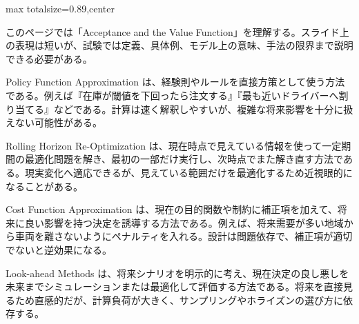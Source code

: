 \begin{minipage}[t]{0.58\textwidth}
\begin{adjustbox}{max totalsize={\textwidth}{0.89\textheight},center}
\begin{minipage}{\textwidth}\scriptsize
{}このページでは「Acceptance and the Value Function」を理解する。スライド上の表現は短いが、試験では定義、具体例、モデル上の意味、手法の限界まで説明できる必要がある。\par
Policy Function Approximation は、経験則やルールを直接方策として使う方法である。例えば『在庫が閾値を下回ったら注文する』『最も近いドライバーへ割り当てる』などである。計算は速く解釈しやすいが、複雑な将来影響を十分に扱えない可能性がある。\par
Rolling Horizon Re-Optimization は、現在時点で見えている情報を使って一定期間の最適化問題を解き、最初の一部だけ実行し、次時点でまた解き直す方法である。現実変化へ適応できるが、見えている範囲だけを最適化するため近視眼的になることがある。\par
Cost Function Approximation は、現在の目的関数や制約に補正項を加えて、将来に良い影響を持つ決定を誘導する方法である。例えば、将来需要が多い地域から車両を離さないようにペナルティを入れる。設計は問題依存で、補正項が適切でないと逆効果になる。\par
Look-ahead Methods は、将来シナリオを明示的に考え、現在決定の良し悪しを未来までシミュレーションまたは最適化して評価する方法である。将来を直接見るため直感的だが、計算負荷が大きく、サンプリングやホライズンの選び方に依存する。\par

\end{minipage}
\end{adjustbox}
\end{minipage}
